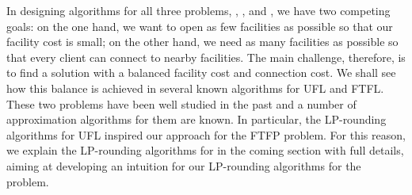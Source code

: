 \documentclass[oneside,final]{ucr}
\begin{document}
In designing algorithms for all three problems, {\UFL},
{\FTFL}, and {\FTFP}, we have two competing goals: on the
one hand, we want to open as few facilities as possible so
that our facility cost is small; on the other hand, we need
as many facilities as possible so that every client can
connect to nearby facilities. The main challenge, therefore,
is to find a solution with a balanced facility cost and
connection cost. We shall see how this balance is achieved
in several known algorithms for UFL and FTFL. These two
problems have been well studied in the past and a number of
approximation algorithms for them are known. In particular,
the LP-rounding algorithms for UFL inspired our approach for
the FTFP problem. For this reason, we explain the
LP-rounding algorithms for {\UFL} in the coming section with
full details, aiming at developing an intuition for our
LP-rounding algorithms for the {\FTFP} problem.
\end{document}
